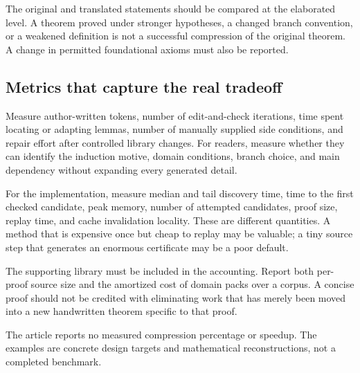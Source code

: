 \documentclass[11pt,a4paper]{article}
\theoremstyle{remark}
\begin{document}
The original and translated statements should be compared at the elaborated level. A theorem proved under stronger hypotheses, a changed branch convention, or a weakened definition is not a successful compression of the original theorem. A change in permitted foundational axioms must also be reported.

\subsection{Metrics that capture the real tradeoff}
Measure author-written tokens, number of edit-and-check iterations, time spent locating or adapting lemmas, number of manually supplied side conditions, and repair effort after controlled library changes. For readers, measure whether they can identify the induction motive, domain conditions, branch choice, and main dependency without expanding every generated detail.

For the implementation, measure median and tail discovery time, time to the first checked candidate, peak memory, number of attempted candidates, proof size, replay time, and cache invalidation locality. These are different quantities. A method that is expensive once but cheap to replay may be valuable; a tiny source step that generates an enormous certificate may be a poor default.

The supporting library must be included in the accounting. Report both per-proof source size and the amortized cost of domain packs over a corpus. A concise proof should not be credited with eliminating work that has merely been moved into a new handwritten theorem specific to that proof.

The article reports no measured compression percentage or speedup. The examples are concrete design targets and mathematical reconstructions, not a completed benchmark.
\end{document}
